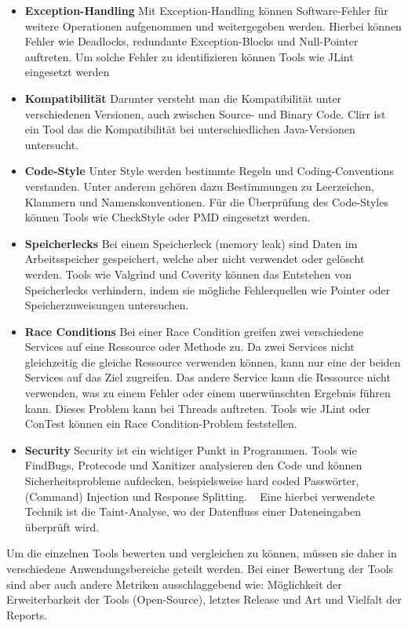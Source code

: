 \begin{itemize}
\item \textbf{Exception-Handling} Mit Exception-Handling können Software-Fehler für weitere Operationen aufgenommen und weitergegeben werden. Hierbei können Fehler wie Deadlocks, redundante Exception-Blocks und Null-Pointer auftreten. Um solche Fehler zu identifizieren können Tools wie JLint eingesetzt werden
\item \textbf{Kompatibilität} Darunter versteht man die Kompatibilität unter verschiedenen Versionen, auch zwischen Source- und Binary Code.  Clirr ist ein Tool das die Kompatibilität bei unterschiedlichen Java-Versionen untersucht. 
\item \textbf{Code-Style} Unter Style werden bestimmte Regeln und Coding-Conventions verstanden. Unter anderem gehören dazu Bestimmungen zu Leerzeichen, Klammern und Namenskonventionen. Für die Überprüfung des Code-Styles können Tools wie CheckStyle oder PMD eingesetzt werden.
\item \textbf{Speicherlecks}
Bei einem Speicherleck (memory leak) sind Daten im Arbeitsspeicher gespeichert,  welche aber nicht verwendet oder gelöscht werden. Tools wie Valgrind und Coverity können das Entstehen von Speicherlecks verhindern, indem sie mögliche Fehlerquellen wie Pointer oder Speicherzuweisungen untersuchen.
\item \textbf{Race Conditions}
Bei einer Race Condition greifen zwei verschiedene Services auf eine Ressource oder Methode zu. Da zwei Services nicht gleichzeitig die  gleiche Ressource verwenden können, kann nur eine der beiden Services auf das Ziel zugreifen. Das andere Service kann die Ressource nicht verwenden, was zu einem Fehler oder einem unerwünschten Ergebnis führen kann. Dieses Problem kann bei Threads auftreten. Tools wie JLint oder ConTest können ein Race Condition-Problem feststellen.
\item \textbf{Security}
Security ist ein wichtiger Punkt in Programmen. Tools wie FindBugs, Protecode und Xanitizer analysieren den Code und können Sicherheitsprobleme aufdecken, beispielsweise hard coded Passwörter, (Command) Injection und Response Splitting. ~\parencite{goseva2015capability} Eine hierbei verwendete Technik ist die Taint-Analyse, wo der Datenfluss einer Dateneingaben überprüft wird. ~\parencite{jung2014sensitive}
\end{itemize}

Um die einzelnen Tools bewerten und vergleichen zu können, müssen sie daher in verschiedene Anwendungsbereiche geteilt werden. Bei einer Bewertung der Tools sind aber auch andere Metriken ausschlaggebend wie: Möglichkeit der Erweiterbarkeit der Tools (Open-Source), letztes Release und Art und Vielfalt der Reports. ~\parencite{comparativeAnalysisTools}

